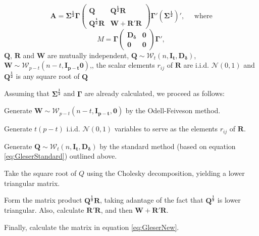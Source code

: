 \begin{equation}
	\boldsymbol{A} = \boldsymbol{\Sigma^{\frac{1}{2}}} \boldsymbol{\Gamma}  
	\begin{pmatrix}
		\boldsymbol{Q} & \boldsymbol{Q^{\frac{1}{2}}R} \\
		\boldsymbol{Q^{\frac{1}{2}}R} & \boldsymbol{W+R'R}
	\end{pmatrix}
	\boldsymbol{\Gamma'} \left(\boldsymbol{\Sigma^{\frac{1}{2}}}\right)', \quad \text{ where}\label{eq:GleserNew}
\end{equation}
\begin{equation}
	M = \boldsymbol{\Gamma} 
	\begin{pmatrix}
		\boldsymbol{D_{\delta}} & \boldsymbol{0} \\
		\boldsymbol{0} & \boldsymbol{0}
	\end{pmatrix}
	\boldsymbol{\Gamma}' ,
\end{equation}
$\boldsymbol{Q}$, $\boldsymbol{R}$ and $\boldsymbol{W}$ are mutually independent,  $\boldsymbol{Q}  \sim \mathcal{W}_t(n, \boldsymbol{I_t}, \boldsymbol{D_{\delta}})$, $\boldsymbol{W}  \sim \mathcal{W}_{p-t}(n-t, \boldsymbol{I_{p-t}}\boldsymbol{0})$,, the scalar elements $r_{ij}$ of $\boldsymbol{R}$ are  i.i.d.  $\mathcal{N}(0, 1)$ and  $\boldsymbol{Q^{\frac{1}{2}}}$ is any square root of $\boldsymbol{Q}$

\vpara
Assuming that $\boldsymbol{\Sigma^{\frac{1}{2}}}$ and $\boldsymbol{\Gamma}$ are already calculated, we proceed as follows:


Generate $\boldsymbol{W}  \sim \mathcal{W}_{p-t}(n-t, \boldsymbol{I_{p-t}}, \boldsymbol{0})$ by the Odell-Feiveson method.

Generate $t(p-t)$  i.i.d.  $\mathcal{N}(0, 1)$ variables to serve as the elements $r_{ij}$ of $\boldsymbol{R}$.

Generate $\boldsymbol{Q}  \sim \mathcal{W}_t(n, \boldsymbol{I_t}, \boldsymbol{D_{\delta}})$ by the standard method (based on equation \ref{eq:GleserStandard}) outlined above.

Take the square root of $Q$ using the Cholesky decomposition, yielding a lower triangular matrix.

Form the matrix product $\boldsymbol{Q^{\frac{1}{2}}R}$, taking adantage of the fact that $\boldsymbol{Q^{\frac{1}{2}}}$ is lower triangular. Also, calculate $\boldsymbol{R'R}$, and then $\boldsymbol{W+R'R}$.

Finally, calculate the matrix in equation \ref{eq:GleserNew}.




